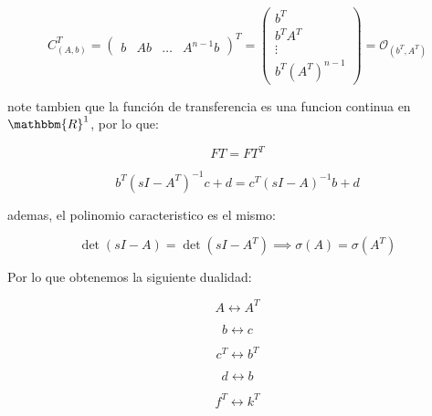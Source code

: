 		\begin{equation}
			C^T_{(A, b)} =
			\begin{pmatrix}
				b & A b & \dots & A^{n-1} b
			\end{pmatrix}^T =
			\begin{pmatrix}
				b^T \\
				b^T A^T \\
				\vdots \\
				b^T (A^T)^{n-1}
			\end{pmatrix} = \mathcal{O}_{(b^T, A^T)}
		\end{equation}

		note tambien que la función de transferencia es una funcion continua en $\mathbbm{R}^1$, por lo que:

		\begin{equation*}
			FT = FT^T
		\end{equation*}

		\begin{equation}
			b^T \left( sI - A^T \right)^{-1} c + d = c^T \left( sI - A \right)^{-1} b + d
		\end{equation}

		ademas, el polinomio caracteristico es el mismo:

		\begin{equation}
			\det{(sI - A)} = \det{(sI - A^T)} \implies \sigma(A) = \sigma (A^T)
		\end{equation}

		Por lo que obtenemos la siguiente dualidad:

		\begin{equation*}
			A \leftrightarrow A^T
		\end{equation*}

		\begin{equation*}
			b \leftrightarrow c
		\end{equation*}

		\begin{equation*}
			c^T \leftrightarrow b^T
		\end{equation*}

		\begin{equation*}
			d \leftrightarrow b
		\end{equation*}

		\begin{equation*}
			f^T \leftrightarrow k^T
		\end{equation*}


